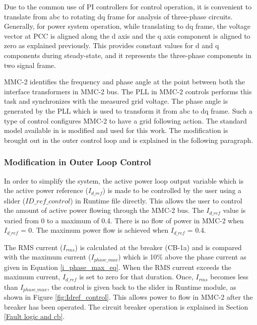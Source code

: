 Due to the common use of \gls{PI} controllers for control operation, it is convenient to translate from abc to rotating dq frame for analysis of three-phase circuits. Generally, for power system operation, while translating to dq frame, the voltage vector at \gls{PCC} is aligned along the d axis and the q axis component is aligned to zero as explained previously. This provides constant values for d and q components during steady-state, and it represents the three-phase components in two signal frame.

\gls{MMC}-2 identifies the frequency and phase angle at the point between both the interface transformers in \gls{MMC}-2 bus. The \gls{PLL} in \gls{MMC}-2 controls performs this task and synchronizes with the measured grid voltage. The phase angle is generated by the \gls{PLL} which is used to transform it from abc to dq frame. Such a type of control configures \gls{MMC}-2 to have a grid following action. The standard model available in \cite{vrana2013cigre} is modified and used for this work. The modification is brought out in the outer control loop and is explained in the following paragraph.    

\subsubsection{Modification in Outer Loop Control}
In order to simplify the system, the active power loop output variable which is the active power reference ($I_{d\_ref}$) is made to be controlled by the user using a slider ($ID\_ref\_control$) in Runtime file directly. This allows the user to control the amount of active power flowing through the \gls{MMC}-2 bus. The $I_{d\_ref}$ value is varied from 0 to a maximum of 0.4. There is no flow of power in \gls{MMC}-2 when $I_{d\_ref}$ = 0. The maximum power flow is achieved when $I_{d\_ref}$ = 0.4. %

The RMS current ($I_{rms}$) is calculated at the breaker (CB-1a) and is compared with the maximum current ($I_{phase\_max}$) which is 10\% above the phase current as given in Equation \ref{i_phase_max_eq}. When the RMS current exceeds the maximum current, $I_{d\_ref}$ is set to zero for that duration. Once, $I_{rms}$ becomes less than $I_{phase\_max}$, the control is given back to the slider in Runtime module, as shown in Figure \ref{fig:Idref_control}. This allows power to flow in \gls{MMC}-2 after the breaker has been operated. The circuit breaker operation is explained in Section \ref{Fault logic and cb}.

